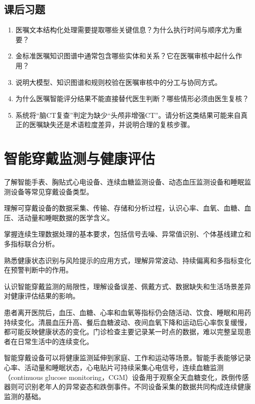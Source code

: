 \subsection*{课后习题}
\begin{enumerate}
\setlength{\itemsep}{6pt}

\item 医嘱文本结构化处理需要提取哪些关键信息？为什么执行时间与顺序尤为重要？
\item 金标准医嘱知识图谱中通常包含哪些实体和关系？它在医嘱审核中起什么作用？
\item 说明大模型、知识图谱和规则校验在医嘱审核中的分工与协同方式。
\item 为什么医嘱智能评分结果不能直接替代医生判断？哪些情形必须由医生复核？
\item 系统将“脑CT复查”判定为缺少“头颅非增强CT”。请分析这类结果可能来自真正的医嘱缺失还是术语粒度差异，并说明合理的复核步骤。
\end{enumerate}

\clearpage
\section{智能穿戴监测与健康评估}

\begin{sectionkeypoints}
\item 了解智能手表、胸贴式心电设备、连续血糖监测设备、动态血压监测设备和睡眠监测设备等常见穿戴设备类型。
\item 理解可穿戴设备的数据采集、传输、存储和分析过程，认识心率、血氧、血糖、血压、活动量和睡眠数据的医学含义。
\item 掌握连续生理数据处理的基本要求，包括信号去噪、异常值识别、个体基线建立和多指标联合分析。
\item 熟悉健康状态识别与风险提示的应用方式，理解异常波动、持续偏离和多指标变化在预警判断中的作用。
\item 认识智能穿戴监测的局限性，理解设备误差、佩戴方式、数据缺失和生活场景差异对健康评估结果的影响。
\end{sectionkeypoints}
患者离开医院后，血压、血糖、心率和血氧等指标仍会随活动、饮食、睡眠和用药持续变化。清晨血压升高、餐后血糖波动、夜间血氧下降和运动后心率恢复缓慢，都可能反映健康状态的变化。门诊检查主要记录某一时点的数据，难以完整呈现患者在日常生活中的连续变化。

智能穿戴设备可以将健康监测延伸到家庭、工作和运动等场景。智能手表能够记录心率、活动量和睡眠状态，心电贴片可持续采集心电信号，连续血糖监测（continuous glucose monitoring，CGM）设备用于观察全天血糖变化，跌倒传感器则可识别老年人的异常姿态和跌倒事件。不同设备采集的数据共同构成连续健康监测的基础。

